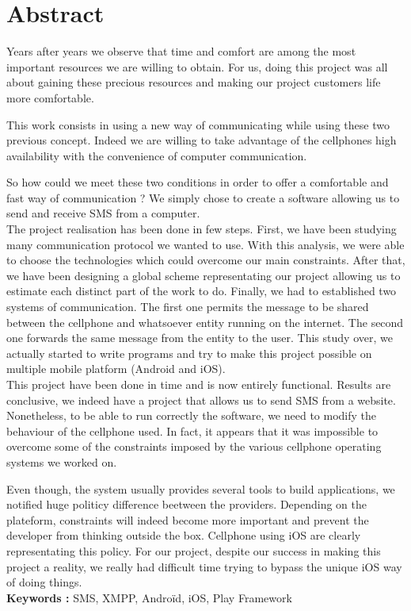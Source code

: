 \cleardoublepage



\chapter*{Abstract}

\thispagestyle{empty}



Years after years we observe that time and comfort are among the most important resources
we are willing to obtain. For us, doing this project was all about gaining these precious
resources and making our project customers life more comfortable.

This work consists in using a new way of communicating while using these two previous concept. 
Indeed we are willing to take advantage of the cellphones high availability with the convenience 
of computer communication.

So how could we meet these two conditions in order to offer a comfortable and fast way of communication ?
We simply chose to create a software allowing us to send and receive SMS from a computer.
\\


The project realisation has been done in few steps. First, we have been studying many communication protocol
we wanted to use. With this analysis, we were able to choose the technologies which could overcome our main constraints.
After that, we have been designing a global scheme representating our project allowing us to estimate
each distinct part of the work to  do. Finally, we had to established two systems of communication.
The first one permits the message to be shared between the cellphone and whatsoever entity running
on the internet. The second one forwards the same message from the entity to the user. This study
over, we actually started to write programs and try to make this project possible on multiple
mobile platform (Android and iOS).
\\


This project have been done in time and is now entirely functional. Results are conclusive,
we indeed have a project that allows us to send SMS from a website. Nonetheless, to be able 
to run correctly the software, we need to modify the behaviour of the cellphone used. In fact,
it appears that it was impossible to overcome some of the constraints imposed by the various
cellphone operating systems we worked on. 

Even though, the system usually provides several tools to build applications, we notified huge
politicy difference beetween the providers. Depending on the plateform, constraints will indeed
become more important and prevent the developer from thinking outside the box.
Cellphone using iOS are clearly representating this policy. For our project, despite our success in
making this project a reality, we really had difficult time trying to bypass the unique iOS way of doing things.
\\



\textbf{Keywords : } SMS, XMPP, Androïd, iOS, Play Framework
